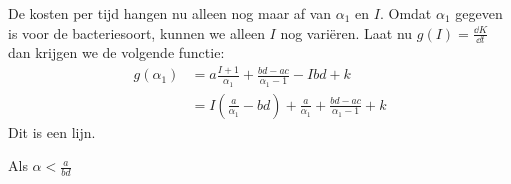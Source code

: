 De kosten per tijd hangen nu alleen nog maar af van $\alpha_1$ en $I$. Omdat $\alpha_1$ gegeven is voor de bacteriesoort, kunnen we alleen $I$ nog vari\"eren. Laat nu $g(I) = \frac{\dd K}{\dd t}$ dan krijgen we de volgende functie:
\begin{align*}
g(\alpha_1)
&=a\frac{I+1}{\alpha_1} + \frac{bd-ac}{\alpha_1-1} - Ibd + k\\
&=I\left(\frac{a}{\alpha_1}-bd\right) + \frac{a}{\alpha_1} + \frac{bd-ac}{\alpha_1-1} + k
\end{align*}
Dit is een lijn.

Als $\alpha<\frac{a}{bd}$








